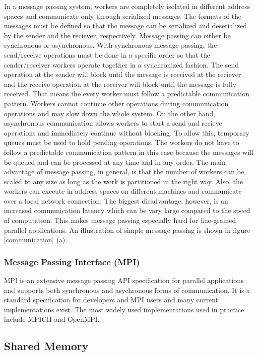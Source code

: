 \documentclass[11pt]{book}
\begin{document}
In a message passing system, workers are completely isolated in different address spaces
and communicate only through serialized messages. The formats of the messages must be
defined so that the message can be serialized and deserialized by the sender and the reciever,
respectively. Message passing can either be synchronous or asynchronous. With synchronous
message passing, the send/receive operations must be done in a specific order so that the
sender/receiver workers operate together in a synchronized fashion. The send operation at
the sender will block until the message is received at the reciever and the receive operation
at the receiver will block until the message is fully received. That means the every worker
must follow a predictable communication pattern. Workers cannot continue other operations
during communication operations and may slow down the whole system. On the other hand,
asynchronous communication allows workers to start a send and recieve operations and immediately
continue without blocking. To allow this, temporary queues must be used to hold pending
operations. The workers do not have to follow a predictable communication pattern in this
case because the messages will be queued and can be processed at any time and in any order.
The main advantage of message passing, in general, is that the number of workers can be scaled
to any size as long as the work is partitioned in the right way. Also, the workers can execute
in address spaces on different machines and communicate over a local network connection. The biggest
disadvantage, however, is an increased communication latency which can be vary large compared
to the speed of computation. This makes message passing especially hard for fine-grained
parallel applications. An illustration of simple message passing is shown in figure
\ref{communication} (a).

\subsubsection{Message Passing Interface (MPI)}

MPI\cite{Forum:1994:MMI:898758} is an extensive message passing API specification for parallel
applications and supports both synchronous and asychronous forms of communication. It is
a standard specification for developers and MPI users and many current implementations exist.
The most widely used implementations used in practice include MPICH and OpenMPI.

\subsection{Shared Memory}
\end{document}

